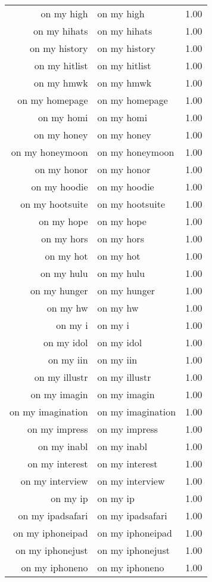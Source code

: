 \begin{table}[ht]
\begin{tabular}{rlr}
  on my high & on my high & 1.00 \\ 
  on my hihats & on my hihats & 1.00 \\ 
  on my history & on my history & 1.00 \\ 
  on my hitlist & on my hitlist & 1.00 \\ 
  on my hmwk & on my hmwk & 1.00 \\ 
  on my homepage & on my homepage & 1.00 \\ 
  on my homi & on my homi & 1.00 \\ 
  on my honey & on my honey & 1.00 \\ 
  on my honeymoon & on my honeymoon & 1.00 \\ 
  on my honor & on my honor & 1.00 \\ 
  on my hoodie & on my hoodie & 1.00 \\ 
  on my hootsuite & on my hootsuite & 1.00 \\ 
  on my hope & on my hope & 1.00 \\ 
  on my hors & on my hors & 1.00 \\ 
  on my hot & on my hot & 1.00 \\ 
  on my hulu & on my hulu & 1.00 \\ 
  on my hunger & on my hunger & 1.00 \\ 
  on my hw & on my hw & 1.00 \\ 
  on my i & on my i & 1.00 \\ 
  on my idol & on my idol & 1.00 \\ 
  on my iin & on my iin & 1.00 \\ 
  on my illustr & on my illustr & 1.00 \\ 
  on my imagin & on my imagin & 1.00 \\ 
  on my imagination & on my imagination & 1.00 \\ 
  on my impress & on my impress & 1.00 \\ 
  on my inabl & on my inabl & 1.00 \\ 
  on my interest & on my interest & 1.00 \\ 
  on my interview & on my interview & 1.00 \\ 
  on my ip & on my ip & 1.00 \\ 
  on my ipadsafari & on my ipadsafari & 1.00 \\ 
  on my iphoneipad & on my iphoneipad & 1.00 \\ 
  on my iphonejust & on my iphonejust & 1.00 \\ 
  on my iphoneno & on my iphoneno & 1.00 \\ 

\end{tabular}
\end{table}
